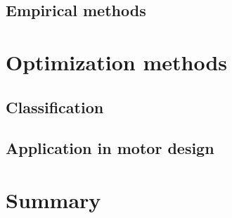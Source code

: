 \subsection{Empirical methods}                  \label{Chapter:background/modelling techniques for designing motors/empirical methods}


\section{Optimization methods}                  \label{Chapter:background/optimization methods}
\subsection{Classification}                     \label{Chapter:background/optimization methods/classification}
\subsection{Application in motor design}        \label{Chapter:background/optimization methods/application in motor design}


\section{Summary}                               \label{Chapter:background/summary}
